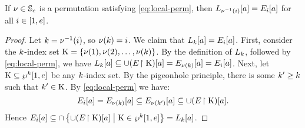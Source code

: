 \begin{lemma}\label{lem:local-lvl-perm}
If $\nu \in \mathbb{S}_{e}$ is a permutation satisfying \cref{eq:local-perm},
then $L_{\nu^{-1}(i)}[a] = E_{i}[a]$ for all $i \in [1,e]$.
\end{lemma}
\begin{proof}
Let $k = \nu^{-1}(i)$, so $\nu(k) = i$.
We claim that $L_{k}[a] = E_{i}[a]$.
First, consider the $k$-index set 
$\mathrm{K} = \left\{\nu(1), \nu(2), \dots, \nu(k)\right\}$.
By the definition of $L_{k}$, followed by \cref{eq:local-perm},
we have $L_{k}[a] \subseteq \cup (E\!\restriction\mathrm{K})[a] = 
E_{\nu(k)}[a] = E_{i}[a]$.
Next, let $\mathrm{K} \subseteq \wp^{k}{[}1,e]$ be any $k$-index set. By the
pigeonhole principle, there is some ${k'} \geq k$ such that ${k'} \in \mathrm{K}$.
By \cref{eq:local-perm} we have:
\[
  E_{i}[a] = E_{\nu(k)}[a] \subseteq 
  E_{\nu({k'})}[a] \subseteq \cup (E\!\restriction\mathrm{K})[a].
\]
Hence
$E_{i}[a] \subseteq \cap
\left\{\cup (E\!\restriction\mathrm{K})[a]\mathrel{}\middle|\mathrel{}\mathrm{K} \in \wp^{k}{[}1, e]\right\} =
L_{k}[a]$.
\end{proof}